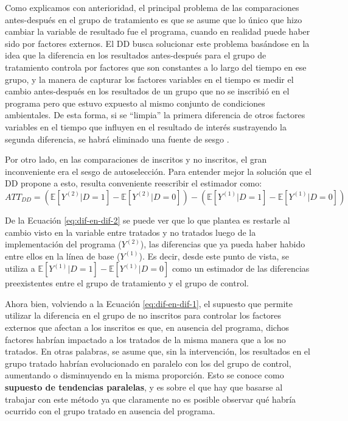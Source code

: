 \documentclass[../../main.tex]{subfiles}
\begin{document}
Como explicamos con anterioridad, el principal problema de las comparaciones antes-después
en el grupo de tratamiento es que se asume que lo único que hizo cambiar la variable de
resultado fue el programa, cuando en realidad puede haber sido por factores externos. El
DD busca solucionar este problema basándose en la idea que la diferencia en los resultados
antes-después para el grupo de tratamiento controla por factores que son constantes a lo
largo del tiempo en ese grupo, y la manera de capturar los factores variables en el tiempo
es medir el cambio antes-después en los resultados de un grupo que no se inscribió en el
programa pero que estuvo expuesto al mismo conjunto de condiciones ambientales. De esta
forma, si se ``limpia'' la primera diferencia de otros factores variables en el tiempo que
influyen en el resultado de interés sustrayendo la segunda diferencia, se habrá eliminado
una fuente de sesgo \cite{gertler-2016}.

Por otro lado, en las comparaciones de inscritos y no inscritos, el gran inconveniente era
el sesgo de autoselección. Para entender mejor la solución que el DD propone a esto,
resulta conveniente reescribir el estimador como:
\begin{equation}
    ATT_{DD} =
        \left(
            \mathbb{E}\left[Y^{(2)}|D=1\right] - \mathbb{E}\left[Y^{(2)}|D=0\right]
        \right) -
        \left(
            \mathbb{E}\left[Y^{(1)}|D=1\right] - \mathbb{E}\left[Y^{(1)}|D=0\right]
        \right)
        \label{eq:dif-en-dif-2}
\end{equation}

De la Ecuación \ref{eq:dif-en-dif-2} se puede ver que lo que plantea es restarle al cambio
visto en la variable entre tratados y no tratados luego de la implementación del programa
(\(Y^{(2)}\)), las diferencias que ya pueda haber habido entre ellos en la línea de base
(\(Y^{(1)}\)). Es decir, desde este punto de vista, se utiliza a
\(\mathbb{E}\left[Y^{(1)}|D=1\right] - \mathbb{E}\left[Y^{(1)}|D=0\right]\) como un
estimador de las diferencias preexistentes entre el grupo de tratamiento y el grupo de
control.

Ahora bien, volviendo a la Ecuación \ref{eq:dif-en-dif-1}, el supuesto que permite
utilizar la diferencia en el grupo de no inscritos para controlar los factores externos
que afectan a los inscritos es que, en ausencia del programa, dichos factores habrían
impactado a los tratados de la misma manera que a los no tratados. En otras palabras, se
asume que, sin la intervención, los resultados en el grupo tratado habrían evolucionado en
paralelo con los del grupo de control, aumentando o disminuyendo en la misma proporción.
Esto se conoce como \textbf{supuesto de tendencias paralelas}, y es sobre el que hay que
basarse al trabajar con este método ya que claramente no es posible observar qué habría
ocurrido con el grupo tratado en ausencia del programa.
\end{document}

